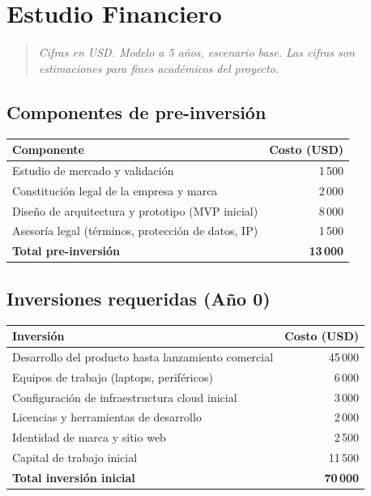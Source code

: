 \section{Estudio Financiero}

\begin{quote}
\emph{Cifras en USD. Modelo a 5 años, escenario base. Las cifras son estimaciones para
fines académicos del proyecto.}
\end{quote}

\subsection{Componentes de pre-inversión}

\begin{table}[ht]
  \centering
  \begin{tabularx}{\linewidth}{Y r}
    \toprule
    \textbf{Componente} & \textbf{Costo (USD)} \\
    \midrule
    Estudio de mercado y validación & 1\,500 \\
    Constitución legal de la empresa y marca & 2\,000 \\
    Diseño de arquitectura y prototipo (MVP inicial) & 8\,000 \\
    Asesoría legal (términos, protección de datos, IP) & 1\,500 \\
    \midrule
    \textbf{Total pre-inversión} & \textbf{13\,000} \\
    \bottomrule
  \end{tabularx}
\end{table}

\subsection{Inversiones requeridas (Año 0)}

\begin{table}[ht]
  \centering
  \begin{tabularx}{\linewidth}{Y r}
    \toprule
    \textbf{Inversión} & \textbf{Costo (USD)} \\
    \midrule
    Desarrollo del producto hasta lanzamiento comercial & 45\,000 \\
    Equipos de trabajo (laptops, periféricos) & 6\,000 \\
    Configuración de infraestructura cloud inicial & 3\,000 \\
    Licencias y herramientas de desarrollo & 2\,000 \\
    Identidad de marca y sitio web & 2\,500 \\
    Capital de trabajo inicial & 11\,500 \\
    \midrule
    \textbf{Total inversión inicial} & \textbf{70\,000} \\
    \bottomrule
  \end{tabularx}
\end{table}

